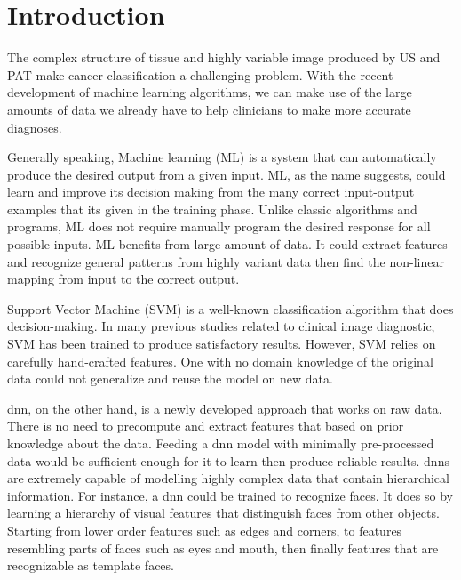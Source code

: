 
\chapter{Introduction} %




The complex structure of tissue and highly variable image produced by US and PAT make cancer classification a challenging problem. With the recent development of machine learning algorithms, we can make use of the large amounts of data we already have to help clinicians to make more accurate diagnoses. 

Generally speaking, Machine learning (ML) is a system that can automatically produce the desired output from a given input. ML, as the name suggests, could learn and improve its decision making from the many correct input-output examples that its given in the training phase. Unlike classic algorithms and programs, ML does not require manually program the desired response for all possible inputs. ML benefits from large amount of data. It could extract features and recognize general patterns from highly variant data then find the non-linear mapping from input to the correct output. 

Support Vector Machine (SVM) is a well-known classification algorithm that does decision-making. In many previous studies related to clinical image diagnostic, SVM has been trained to produce satisfactory results. However, SVM relies on carefully hand-crafted features. One with no domain knowledge of the original data could not generalize and reuse the model on new data.

\ac{dnn}, on the other hand, is a newly developed approach that works on raw data. There is no need to precompute and extract features that based on prior knowledge about the data. Feeding a \ac{dnn} model with minimally pre-processed data would be sufficient enough for it to learn then produce reliable results. \acp{dnn} are extremely capable of modelling highly complex data that contain hierarchical information. For instance, a \ac{dnn} could be trained to recognize faces. It does so by learning a hierarchy of visual features that distinguish faces from other objects. Starting from lower order features such as edges and corners, to features resembling parts of faces such as eyes and mouth, then finally features that are recognizable as template faces.

